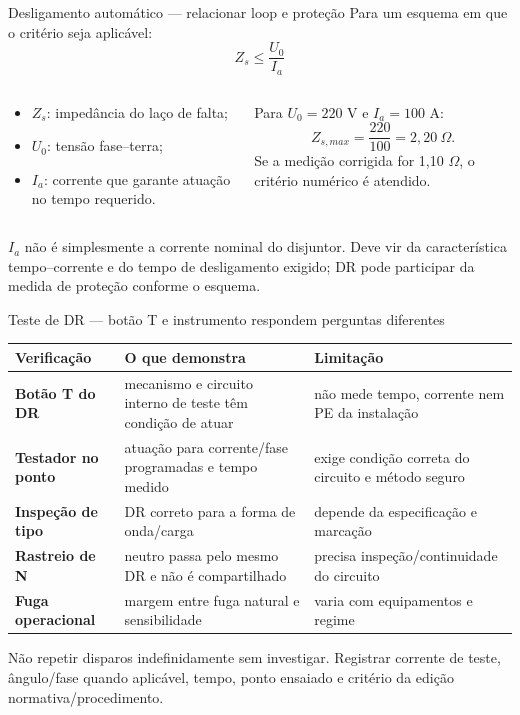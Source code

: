 \begin{frame}{Desligamento automático — relacionar loop e proteção}
\small
Para um esquema em que o critério seja aplicável:
\[
Z_s\leq\frac{U_0}{I_a}
\]
\begin{columns}[T,onlytextwidth]
\begin{caixaDef}[title=Termos]
\begin{itemize}
\item $Z_s$: impedância do laço de falta;
\item $U_0$: tensão fase--terra;
\item $I_a$: corrente que garante atuação no tempo requerido.
\end{itemize}
\end{caixaDef}
\begin{caixaEx}[title=Exemplo didático]
Para $U_0=220$ V e $I_a=100$ A:
\[
Z_{s,max}=\frac{220}{100}=2{,}20\ \Omega.
\]
Se a medição corrigida for 1,10 $\Omega$, o critério numérico é atendido.
\end{caixaEx}
\end{columns}
\begin{caixaAt}
$I_a$ não é simplesmente a corrente nominal do disjuntor. Deve vir da característica tempo--corrente e do tempo de desligamento exigido; DR pode participar da medida de proteção conforme o esquema.
\end{caixaAt}
\end{frame}

\begin{frame}{Teste de DR — botão T e instrumento respondem perguntas diferentes}
\scriptsize
\begin{tabularx}{\textwidth}{>{\bfseries}p{2.9cm}X X}
\toprule
Verificação & O que demonstra & Limitação \\
\midrule
Botão T do DR & mecanismo e circuito interno de teste têm condição de atuar & não mede tempo, corrente nem PE da instalação \\
Testador no ponto & atuação para corrente/fase programadas e tempo medido & exige condição correta do circuito e método seguro \\
Inspeção de tipo & DR correto para a forma de onda/carga & depende da especificação e marcação \\
Rastreio de N & neutro passa pelo mesmo DR e não é compartilhado & precisa inspeção/continuidade do circuito \\
Fuga operacional & margem entre fuga natural e sensibilidade & varia com equipamentos e regime \\
\bottomrule
\end{tabularx}
\begin{caixaAt}
Não repetir disparos indefinidamente sem investigar. Registrar corrente de teste, ângulo/fase quando aplicável, tempo, ponto ensaiado e critério da edição normativa/procedimento.
\end{caixaAt}
\end{frame}

